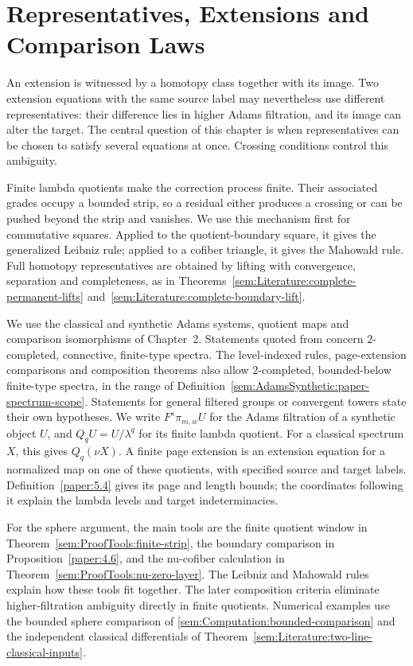 \chapter{Representatives, Extensions and Comparison Laws}
An extension is witnessed by a homotopy class together with its image.
Two extension equations with the same source label may nevertheless use
different representatives: their difference lies in higher Adams
filtration, and its image can alter the target. The central question of
this chapter is when representatives can be chosen to satisfy several
equations at once. Crossing conditions control this ambiguity.

Finite lambda quotients make the correction process finite. Their
associated grades occupy a bounded strip, so a residual either produces
a crossing or can be pushed beyond the strip and vanishes.
We use this mechanism first for commutative squares. Applied to the
quotient-boundary square, it gives the generalized Leibniz rule;
applied to a cofiber triangle, it gives the Mahowald rule. Full homotopy representatives are obtained by lifting with
convergence, separation and completeness, as in
Theorems~\ref{sem:Literature:complete-permanent-lifts}
and~\ref{sem:Literature:complete-boundary-lift}.

We use the classical and synthetic Adams systems, quotient maps and
comparison isomorphisms of Chapter~2. Statements quoted from
\cite{LWX126} concern $2$-completed, connective, finite-type spectra.
The level-indexed rules, page-extension comparisons and composition
theorems also allow $2$-completed, bounded-below finite-type spectra, in
the range of Definition~\ref{sem:AdamsSynthetic:paper-spectrum-scope}.
Statements for general filtered groups or convergent towers state their
own hypotheses. We write $F^s\pi_{m,w}U$ for the Adams filtration of a
synthetic object $U$, and $Q_qU=U/\lambda^q$ for its finite lambda
quotient. For a classical spectrum $X$, this gives $Q_q(\nu X)$.
A finite page extension is an extension equation for a normalized map
on one of these quotients, with specified source and target labels.
Definition~\ref{paper:5.4} gives its page and length bounds; the
coordinates following it explain the lambda levels and target
indeterminacies.

For the sphere argument, the main tools are the finite quotient window
in Theorem~\ref{sem:ProofTools:finite-strip}, the boundary comparison in
Proposition~\ref{paper:4.6}, and the nu-cofiber calculation in
Theorem~\ref{sem:ProofTools:nu-zero-layer}. The Leibniz and Mahowald rules
explain how these tools fit together. The later composition criteria
eliminate higher-filtration ambiguity directly in finite quotients.
Numerical examples use the
bounded sphere comparison of \ref{sem:Computation:bounded-comparison}
and the independent classical differentials of
Theorem~\ref{sem:Literature:two-line-classical-inputs}.

